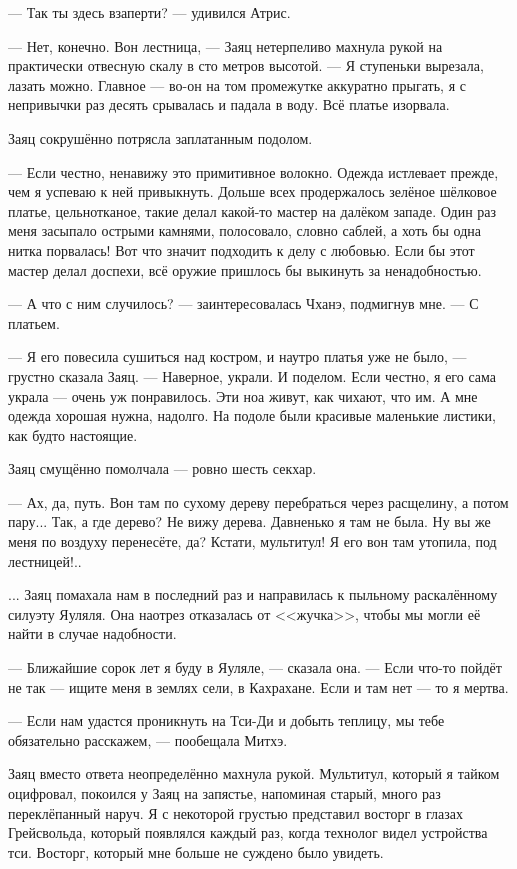 --- Так ты здесь взаперти? --- удивился Атрис.

--- Нет, конечно.
Вон лестница, --- Заяц нетерпеливо махнула рукой на практически отвесную скалу в сто метров высотой.
--- Я ступеньки вырезала, лазать можно.
Главное --- во-он на том промежутке аккуратно прыгать, я с непривычки раз десять срывалась и падала в воду.
Всё платье изорвала.

Заяц сокрушённо потрясла заплатанным подолом.

--- Если честно, ненавижу это примитивное волокно.
Одежда истлевает прежде, чем я успеваю к ней привыкнуть.
Дольше всех продержалось зелёное шёлковое платье, цельнотканое, такие делал какой-то мастер на далёком западе.
Один раз меня засыпало острыми камнями, полосовало, словно саблей, а хоть бы одна нитка порвалась!
Вот что значит подходить к делу с любовью.
Если бы этот мастер делал доспехи, всё оружие пришлось бы выкинуть за ненадобностью.

--- А что с ним случилось? --- заинтересовалась Чханэ, подмигнув мне.
--- С платьем.

--- Я его повесила сушиться над костром, и наутро платья уже не было, --- грустно сказала Заяц.
--- Наверное, украли.
И поделом.
Если честно, я его сама украла --- очень уж понравилось.
Эти ноа живут, как чихают, что им.
А мне одежда хорошая нужна, надолго.
На подоле были красивые маленькие листики, как будто настоящие.

Заяц смущённо помолчала --- ровно шесть секхар.

--- Ах, да, путь.
Вон там по сухому дереву перебраться через расщелину, а потом пару...
Так, а где дерево?
Не вижу дерева.
Давненько я там не была.
Ну вы же меня по воздуху перенесёте, да?
Кстати, мультитул!
Я его вон там утопила, под лестницей!..

... Заяц помахала нам в последний раз и направилась к пыльному раскалённому силуэту Яуляля.
Она наотрез отказалась от <<жучка>>, чтобы мы могли её найти в случае надобности.

--- Ближайшие сорок лет я буду в Яуляле, --- сказала она.
--- Если что-то пойдёт не так --- ищите меня в землях сели, в Кахрахане.
Если и там нет --- то я мертва.

--- Если нам удастся проникнуть на Тси-Ди и добыть теплицу, мы тебе обязательно расскажем, --- пообещала Митхэ.

Заяц вместо ответа неопределённо махнула рукой.
Мультитул, который я тайком оцифровал, покоился у Заяц на запястье, напоминая старый, много раз переклёпанный наруч.
Я с некоторой грустью представил восторг в глазах Грейсвольда, который появлялся каждый раз, когда технолог видел устройства тси.
Восторг, который мне больше не суждено было увидеть.

